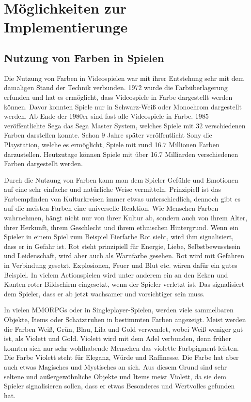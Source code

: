 \chapter{Möglichkeiten zur Implementierunge}
\label{cha:sa_Einleitung}

\section{Nutzung von Farben in Spielen}
Die Nutzung von Farben in Videospielen war mit ihrer Entstehung sehr mit dem damaligen Stand der Technik verbunden. 1972 wurde die Farbüberlagerung erfunden und hat es ermöglicht, dass Videospiele in Farbe dargestellt werden können. Davor konnten Spiele nur in Schwarz-Weiß oder Monochrom dargestellt werden. Ab Ende der 1980er sind fast alle Videospiele in Farbe. 1985 veröffentlichte Sega das Sega Master System, welches Spiele mit 32 verschiedenen Farben darstellen konnte. Schon 9 Jahre später veröffentlicht Sony die Playstation, welche es ermöglicht, Spiele mit rund 16.7 Millionen Farben darzustellen. Heutzutage können Spiele mit über 16.7 Milliarden verschiedenen Farben dargestellt werden. 

Durch die Nutzung von Farben kann man dem Spieler Gefühle und Emotionen auf eine sehr einfache und natürliche Weise vermitteln. Prinzipiell ist das Farbempfinden von Kulturkreisen immer etwas unterschiedlich, dennoch gibt es auf die meisten Farben eine universelle Reaktion. Wie Menschen Farben wahrnehmen, hängt nicht nur von ihrer Kultur ab, sondern auch von ihrem Alter, ihrer Herkunft, ihrem Geschlecht und ihrem ethnischen Hintergrund. Wenn ein Spieler in einem Spiel zum Beispiel Eierfarbe Rot sieht, wird ihm signalisiert, dass er in Gefahr ist. Rot steht prinzipiell für Energie, Liebe, Selbstbewusstsein und Leidenschaft, wird aber auch als Warnfarbe gesehen. Rot wird mit Gefahren in Verbindung gesetzt. Explosionen, Feuer und Blut etc. wären dafür ein gutes Beispiel. In vielem Actionspielen wird unter anderem ein an den Ecken und Kanten roter Bildschirm eingesetzt, wenn der Spieler verletzt ist. Das signalisiert dem Spieler, dass er ab jetzt wachsamer und vorsichtiger sein muss. 

In vielen MMORPGs oder in Singleplayer-Spielen, werden viele sammelbaren Objekte, Items oder Schatztruhen in bestimmten Farben angezeigt. Meist werden die Farben Weiß, Grün, Blau, Lila und Gold verwendet, wobei Weiß weniger gut ist, als Violett und Gold. Violett wird mit dem Adel verbunden, denn früher konnten sich nur sehr wohlhabende Menschen das violette Farbpigment leisten. Die Farbe Violett steht für Eleganz, Würde und Raffinesse. Die Farbe hat aber auch etwas Magisches und Mystisches an sich. Aus diesem Grund sind sehr seltene und außergewöhnliche Objekte und Items meist Violett, da sie dem Spieler signalisieren sollen, dass er etwas Besonderes und Wertvolles gefunden hat. 

